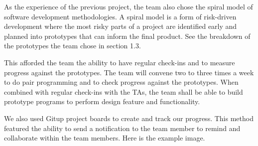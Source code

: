 As the experience of the previous project, the team also chose the spiral model of software development methodologies. A spiral model is a form of risk-driven development where the most risky parts of a project are identified early and planned into prototypes that can inform the final product. See the breakdown of the prototypes the team chose in section 1.3.

This afforded the team the ability to have regular check-ins and to measure progress against the prototypes. The team will convene two to three times a week to do pair programming and to check progress against the prototypes. When combined with regular check-ins with the TAs, the team shall be able to build prototype programs to perform design feature and functionality.

We also used Gitup project boards to create and track our progress. This method featured the ability to send a notification to the team member to remind and collaborate within the team members. Here is the example image.